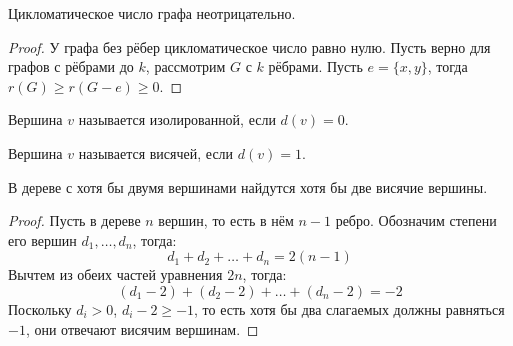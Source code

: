 \documentclass[12pt]{article}
\begin{document}
\begin{lemma}
	Цикломатическое число графа неотрицательно.
	\begin{proof}
		У графа без рёбер цикломатическое число равно нулю. Пусть верно для
		графов с рёбрами до $k$, рассмотрим $G$ с $k$ рёбрами. Пусть
		$e=\{x,y\}$, тогда $r(G)\geqslant r(G-e)\geqslant0$.
	\end{proof}
\end{lemma}
\begin{definition}
	Вершина $v$ называется изолированной, если $d(v)=0$.
\end{definition}
\begin{definition}
	Вершина $v$ называется висячей, если $d(v)=1$.
\end{definition}
\begin{theorem}
	В дереве с хотя бы двумя вершинами найдутся хотя бы две висячие вершины.
	\begin{proof}
		Пусть в дереве $n$ вершин, то есть в нём $n-1$ ребро. Обозначим
		степени его вершин $d_1,\ldots,d_n$, тогда:
		\[d_1+d_2+\ldots+d_n=2(n-1)\]
		Вычтем из обеих частей уравнения $2n$, тогда:
		\[(d_1-2)+(d_2-2)+\ldots+(d_n-2)=-2\]
		Поскольку $d_i>0$, $d_i-2\geqslant-1$, то есть хотя бы два
		слагаемых должны равняться $-1$, они отвечают висячим вершинам.
	\end{proof}
\end{theorem}
\end{document}
